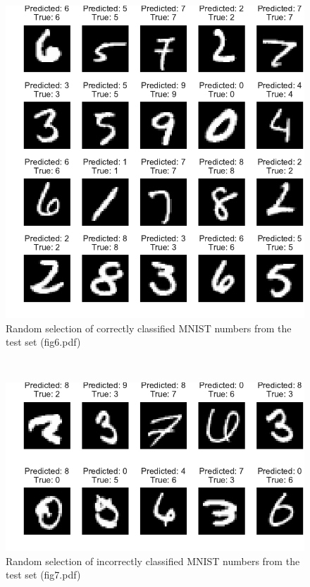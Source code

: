\documentclass{article}
\begin{document}
\noindent \\
\begin{figure}[H]
        \centering
        \includegraphics{fig6.pdf}
        \caption[width=7in]{Random selection of correctly classified MNIST numbers from the test set (fig6.pdf)}
        \label{zfigure6}
\end{figure}

\noindent \\
\begin{figure}[H]
        \centering
        \includegraphics{fig7.pdf}
        \caption[width=7in]{Random selection of incorrectly classified MNIST numbers from the test set (fig7.pdf)}
        \label{zfigure7}
\end{figure}
\end{document}
